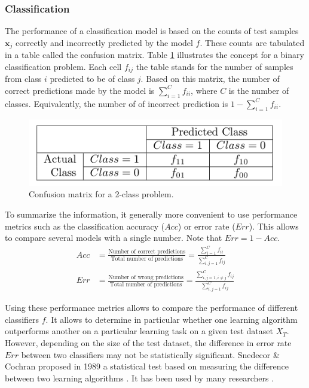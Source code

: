 \subsubsection{Classification}
The performance of a classification model is based on the counts of test samples $\textbf{x}_j$ correctly and incorrectly predicted by the model $f$. These counts are tabulated in a table called the confusion matrix. Table \ref{fig:ConfusionMatrix} illustrates the concept for a binary classification problem. Each cell $f_{ij}$ the table stands for the number of samples from class $i$ predicted to be of class $j$. Based on this matrix, the number of correct predictions made by the model is $\sum_{i=1}^C f_{ii}$, where $C$ is the number of classes. Equivalently, the number of of incorrect prediction is $1-\sum_{i=1}^C f_{ii}$.
\begin{figure}[h!]
	\centering
	\includegraphics[width=0.4\linewidth]{images/ConfusionMatrix}
	\caption{Confusion matrix for a 2-class problem.}
	\label{fig:ConfusionMatrix}
\end{figure}

To summarize the information, it generally more convenient to use performance metrics such as the classification accuracy ($Acc$) or error rate ($Err$). This allows to compare several models with a single number. Note that $Err = 1-Acc$.
\begin{align}
Acc & = \frac{\text{Number of correct predictions}}{\text{Total number of predictions}} = \frac{\sum\limits_{i=1}^{C} f_{ii}}{\sum\limits_{i,j=1}^{C} f_{ij}} \\
Err & = \frac{\text{Number of wrong predictions}}{\text{Total number of predictions}} = \frac{\sum\limits_{i,j=1, i \neq j}^{C} f_{ij}}{\sum\limits_{i,j=1}^{C} f_{ij}}
\end{align}

Using these performance metrics allows to compare the performance of different classifiers $f$. It allows to determine in particular whether one learning algorithm outperforms another on a particular learning task on a given test dataset $X_T$. However, depending on the size of the test dataset, the difference in error rate $Err$ between two classifiers may not be statistically significant. Snedecor \& Cochran proposed in 1989 a statistical test based on measuring the difference between two learning algorithms \cite{Cochran1977}. It has been used by many researchers \cite{Dietterich1997,Dietterich1995}.

